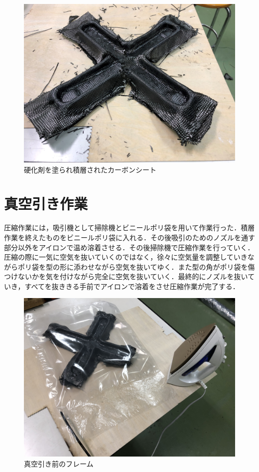 \begin{figure}[htbp]
  \begin{center}
    \includegraphics[width=120mm]{img/１２.JPG}
    \end{center}
  \caption{硬化剤を塗られ積層されたカーボンシート}
 \label{fig:robot}
\end{figure}

\section{真空引き作業}
圧縮作業には，吸引機として掃除機とビニールポリ袋を用いて作業行った．積層作業を終えたものをビニールポリ袋に入れる．その後吸引のためのノズルを通す部分以外をアイロンで温め溶着させる．その後掃除機で圧縮作業を行っていく．圧縮の際に一気に空気を抜いていくのではなく，徐々に空気量を調整していきながらポリ袋を型の形に添わせながら空気を抜いてゆく．また型の角がポリ袋を傷つけないかを気を付けながら完全に空気を抜いていく．最終的にノズルを抜いていき，すべてを抜ききる手前でアイロンで溶着をさせ圧縮作業が完了する．

\begin{figure}[htbp]
  \begin{center}
    \includegraphics[width=120mm]{img/１３.JPG}
    \end{center}
  \caption{真空引き前のフレーム}
 \label{fig:robot}
\end{figure}

